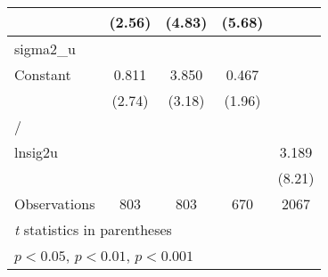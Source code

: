 {\begin{longtable}{l*{4}{c}}
                &   (2.56)         &   (4.83)         &   (5.68)         &                  \\
\midrule
sigma2\_u        &                  &                  &                  &                  \\
Constant        &    0.811\sym{**} &    3.850\sym{**} &    0.467         &                  \\
                &   (2.74)         &   (3.18)         &   (1.96)         &                  \\
\midrule
/               &                  &                  &                  &                  \\
lnsig2u         &                  &                  &                  &    3.189\sym{***}\\
                &                  &                  &                  &   (8.21)         \\
\midrule
Observations    &      803         &      803         &      670         &     2067         \\
\bottomrule
\multicolumn{5}{l}{\footnotesize \textit{t} statistics in parentheses}\\
\multicolumn{5}{l}{\footnotesize \sym{*} \(p<0.05\), \sym{**} \(p<0.01\), \sym{***} \(p<0.001\)}\\
\end{longtable}
}

